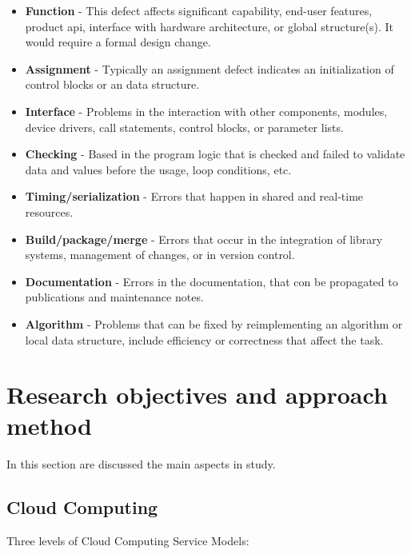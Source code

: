 \begin{itemize}
	\item \textbf{Function} - This defect affects significant capability, end-user features, product \ac{api}, interface with hardware architecture, or global structure(s). It would require a formal design change.
	\item \textbf{Assignment} - Typically an assignment defect indicates an initialization of control blocks or an data structure.
	\item \textbf{Interface} - Problems in the interaction with other components, modules, device drivers, call statements, control blocks, or parameter lists.
	\item \textbf{Checking} - Based in the program logic that is checked and failed to validate data and values before the usage, loop conditions, etc.
	\item \textbf{Timing/serialization} - Errors that happen in shared and real-time resources.
	\item \textbf{Build/package/merge} - Errors that occur in the integration of library systems, management of changes, or in version control.
	\item \textbf{Documentation} - Errors in the documentation, that con be propagated to publications and maintenance notes.
	\item \textbf{Algorithm} - Problems that can be fixed by reimplementing an algorithm or local data structure, include efficiency or correctness that affect the task.
\end{itemize}


\newpage
\section{Research objectives and approach method}

In this section are discussed the main aspects in study.

\subsection{Cloud Computing}

Three levels of Cloud Computing Service Models:

